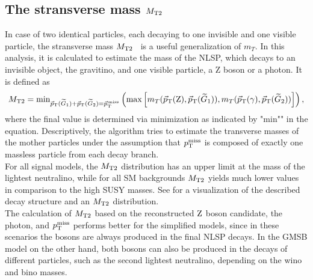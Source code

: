 \subsection*{The stransverse mass $M_{\mathrm{T2}}$}
In case of two identical particles, each decaying to one invisible and one visible particle, the stransverse mass $M_{\mathrm{T2}}$~\cite{Mt2_1,Mt2_2} is a useful generalization of $m_T$. In this analysis, it is calculated to estimate the mass of the NLSP, which decays to an invisible object, the gravitino, and one visible particle, a Z boson or a photon. It is defined as
\begin{equation}
 M_{\mathrm{T2}} = \text{min}_{{\vec p}_{\mathrm{T}}(\widetilde{G}_1)+{\vec p}_{\mathrm{T}}(\widetilde{G}_2)={\vec p}_{\mathrm{T}}^{\kern1pt\text{miss}}}\left(\text{max}\left[m_T({\vec p}_{\mathrm{T}}(\mathrm{Z}),{\vec p}_{\mathrm{T}}(\widetilde{G}_1)),m_T({\vec p}_{\mathrm{T}}(\gamma),{\vec p}_{\mathrm{T}}(\widetilde{G}_2))\right]\right),
\end{equation}
where the final value is determined via minimization as indicated by "$\text{min}$"" in the equation. Descriptively, the algorithm tries to estimate the transverse masses of the mother particles under the assumption that $p_{\mathrm{T}}^\text{miss}$ is composed of exactly one massless particle from each decay branch.\\
For all signal models, the $M_{\mathrm{T2}}$ distribution has an upper limit at the mass of the lightest neutralino, while for all SM backgrounds $M_{\mathrm{T2}}$ yields much lower values in comparison to the high SUSY masses. See  for a visualization of the described decay structure and an $M_{\mathrm{T2}}$ distribution.\\
The calculation of $M_{\mathrm{T2}}$ based on the reconstructed $\mathrm{Z}$ boson candidate, the photon, and $p_{\mathrm{T}}^\text{miss}$ performs better for the simplified models, since in these scenarios the bosons are always produced in the final NLSP decays. In the GMSB model on the other hand, both bosons can also be produced in the decays of different particles, such as the second lightest neutralino, depending on the wino and bino masses.

